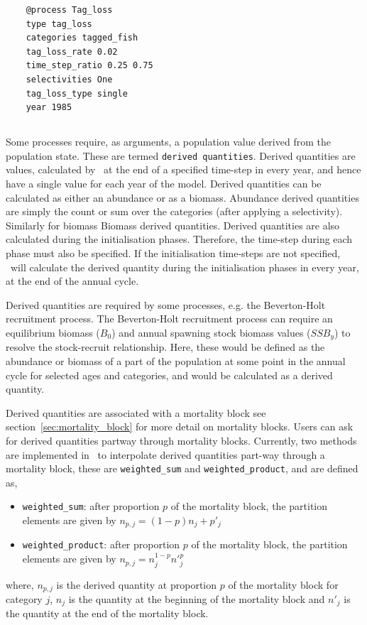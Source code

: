 {\small{\begin{verbatim}
	@process Tag_loss
	type tag_loss
	categories tagged_fish
	tag_loss_rate 0.02
	time_step_ratio 0.25 0.75
	selectivities One
	tag_loss_type single
	year 1985
		\end{verbatim}}}

\subsection{\label{sec:derived-quantities}}

Some processes require, as arguments, a population value derived from the population state. These are termed \texttt{derived quantities}. Derived quantities are values, calculated by \CNAME\ at the end of a specified time-step in every year, and hence have a single value for each year of the model. Derived quantities can be calculated as either an abundance or as a biomass. Abundance derived quantities are simply the count or sum over the categories (after applying a selectivity). Similarly for biomass Biomass derived quantities. Derived quantities are also calculated during the initialisation phases. Therefore, the time-step during each phase must also be specified. If the initialisation time-steps are not specified, \CNAME\ will calculate the derived quantity during the initialisation phases in every year, at the end of the annual cycle. 

Derived quantities are required by some processes, e.g. the Beverton-Holt recruitment process. The Beverton-Holt recruitment process can require an equilibrium biomass ($B_0$) and annual spawning stock biomass values ($SSB_y$) to resolve the stock-recruit relationship. Here, these would be defined as the abundance or biomass of a part of the population at some point in the annual cycle for selected ages and categories, and would be calculated as a derived quantity.

Derived quantities are associated with a mortality block see section~\ref{sec:mortality_block} for more detail on mortality blocks. Users can ask for derived quantities partway through mortality blocks. Currently, two methods are implemented in \CNAME\ to interpolate derived quantities part-way through a mortality block, these are \texttt{weighted\_sum} and \texttt{weighted\_product}, and are defined as,
\begin{itemize}
	\item \texttt{weighted\_sum}: after proportion $p$ of the mortality block, the partition elements are given by $n_{p,j} = (1 - p)n_j + p'_j$
	
	\item \texttt{weighted\_product}: after proportion $p$ of the mortality block, the partition elements are given by $n_{p,j} = n_j^{1-p} n'^p_j$
\end{itemize}
where, $n_{p,j}$ is the derived quantity at proportion $p$ of the mortality block for category $j$, $n_j$ is the quantity at the beginning of the mortality block and $n'_j$ is the quantity at the end of the mortality block.

